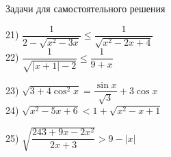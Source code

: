 \documentclass[a4paper,12pt]{article} %
\begin{document}
\begin{center}
{\large Задачи для самостоятельного решения}
\end{center}

\begin{minipage}{0.5\linewidth}
	21) $\dfrac{1}{2-\sqrt{x^2-3x}} \le \dfrac{1}{\sqrt{x^2-2x+4}}$ \\
	22) $\dfrac{1}{\sqrt{|x+1|-2}} \le \dfrac{1}{9+x}$
\end{minipage}
\begin{minipage}{0.5\linewidth}
	23) $\sqrt{3+4\cos^2x}=\dfrac{\sin x}{\sqrt3}+3\cos x$\\
	24) $\sqrt{x^2-5x+6} < 1 + \sqrt{x^2-x+1}$
\end{minipage}
\begin{center}
	25) $\sqrt{\dfrac{243+9x-2x^2}{2x+3}} > 9-|x|$
\end{center}
\end{document}
